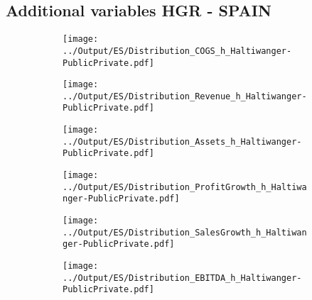 \documentclass[12pt,notitlepage]{article}
\begin{document}
\subsection*{Additional variables HGR - SPAIN}
\begin{figure}[!htpb]
\centering
\begin{subfigure}{.49\textwidth}
    \centering
 \texttt{[image: ../Output/ES/Distribution\_COGS\_h\_Haltiwanger-PublicPrivate.pdf]}
\end{subfigure}%
\begin{subfigure}{.49\textwidth}
    \centering
 \texttt{[image: ../Output/ES/Distribution\_Revenue\_h\_Haltiwanger-PublicPrivate.pdf]}
\end{subfigure}
\begin{subfigure}{.49\textwidth}
    \centering
 \texttt{[image: ../Output/ES/Distribution\_Assets\_h\_Haltiwanger-PublicPrivate.pdf]}
\end{subfigure}%
\begin{subfigure}{.49\textwidth}
    \centering
 \texttt{[image: ../Output/ES/Distribution\_ProfitGrowth\_h\_Haltiwanger-PublicPrivate.pdf]}
\end{subfigure}
\begin{subfigure}{.49\textwidth}
    \centering
 \texttt{[image: ../Output/ES/Distribution\_SalesGrowth\_h\_Haltiwanger-PublicPrivate.pdf]}
\end{subfigure}
\begin{subfigure}{.49\textwidth}
    \centering
 \texttt{[image: ../Output/ES/Distribution\_EBITDA\_h\_Haltiwanger-PublicPrivate.pdf]}
\end{subfigure}
\end{figure}
\clearpage
\end{document}
